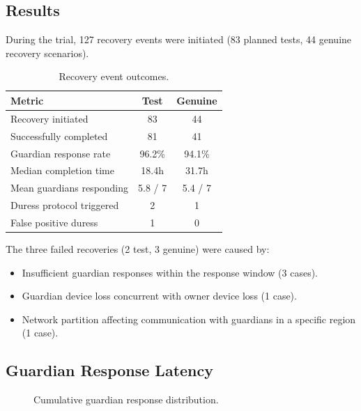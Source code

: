 \documentclass[11pt,a4paper,twocolumn]{article}
\begin{document}
\subsection{Results}

During the trial, 127 recovery events were initiated (83 planned tests, 44 genuine recovery scenarios).

\begin{table}[H]
\centering
\caption{Recovery event outcomes.}
\label{tab:results}
\begin{tabular}{@{}lcc@{}}
\toprule
\textbf{Metric} & \textbf{Test} & \textbf{Genuine} \\
\midrule
Recovery initiated & 83 & 44 \\
Successfully completed & 81 & 41 \\
Guardian response rate & 96.2\% & 94.1\% \\
Median completion time & 18.4h & 31.7h \\
Mean guardians responding & 5.8 / 7 & 5.4 / 7 \\
Duress protocol triggered & 2 & 1 \\
False positive duress & 1 & 0 \\
\bottomrule
\end{tabular}
\end{table}

The three failed recoveries (2 test, 3 genuine) were caused by:
\begin{itemize}
  \item Insufficient guardian responses within the response window (3 cases).
  \item Guardian device loss concurrent with owner device loss (1 case).
  \item Network partition affecting communication with guardians in a specific region (1 case).
\end{itemize}

\subsection{Guardian Response Latency}

\begin{figure}[H]
\centering
{}
\caption{Cumulative guardian response distribution.}
\label{fig:response}
\end{figure}
\end{document}
